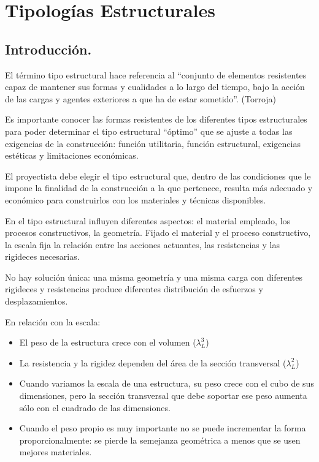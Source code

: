\chapter{Tipologías Estructurales}
\section{Introducción.}
El término tipo estructural hace referencia al ``conjunto de elementos resistentes capaz de mantener sus formas y cualidades a lo largo del tiempo, bajo la acción de las cargas y agentes exteriores a que ha de estar sometido''. (Torroja)

Es importante conocer las formas resistentes de los diferentes tipos estructurales para poder determinar el tipo estructural ``óptimo'' que se ajuste a todas las exigencias de la construcción: función utilitaria, función estructural, exigencias estéticas y limitaciones económicas.

El proyectista debe elegir el tipo estructural que, dentro de las condiciones que le impone la finalidad de la construcción a la que pertenece, resulta más adecuado y económico para construirlos con los materiales y técnicas disponibles.

En el tipo estructural influyen diferentes aspectos: el material empleado, los procesos constructivos, la geometría. Fijado el material y el proceso constructivo, la escala fija la relación entre las acciones actuantes, las resistencias y las rigideces necesarias.

No hay solución única: una misma geometría y una misma carga con diferentes rigideces y resistencias produce diferentes distribución de esfuerzos y desplazamientos.

En relación con la escala:
\begin{itemize}
    \item El peso de la estructura crece con el volumen ($\lambda_L^3$)
    \item La resistencia y la rigidez dependen del área de la sección transversal ($\lambda_L^2$)
    \item Cuando variamos la escala de una estructura, su peso crece con el cubo de sus dimensiones, pero la sección transversal que debe soportar ese peso aumenta sólo con el cuadrado de las dimensiones. 
    \item Cuando el peso propio es muy importante no se puede incrementar la forma proporcionalmente: se pierde la semejanza geométrica a menos que se usen mejores materiales.
\end{itemize}

